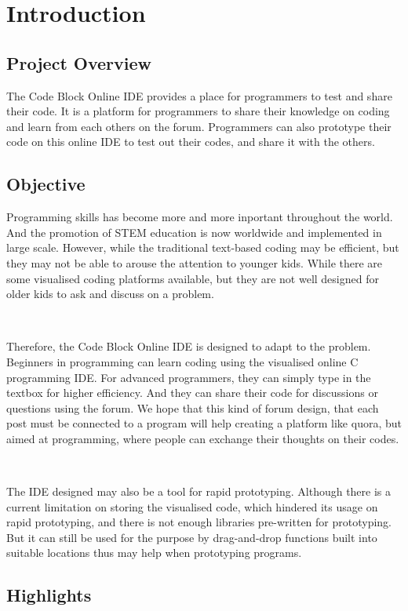 \chapter{Introduction}
\section{Project Overview}
The Code Block Online IDE provides a place for programmers to test and share their code. It is a platform for programmers to share their knowledge on coding and learn from each others on the forum. Programmers can also prototype their code on this online IDE to test out their codes, and share it with the others.

\section{Objective}
Programming skills has become more and more inportant throughout the world. And the promotion of STEM education is now worldwide and implemented in large scale. However, while the traditional text-based coding may be efficient, but they may not be able to arouse the attention to younger kids. While there are some visualised coding platforms available, but they are not well designed for older kids to ask and discuss on a problem.

~

Therefore, the Code Block Online IDE is designed to adapt to the problem. Beginners in programming can learn coding using the visualised online C programming IDE. For advanced programmers, they can simply type in the textbox for higher efficiency. And they can share their code for discussions or questions using the forum. We hope that this kind of forum design, that each post must be connected to a program will help creating a platform like quora, but aimed at programming, where people can exchange their thoughts on their codes.

~

The IDE designed may also be a tool for rapid prototyping. Although there is a current limitation on storing the visualised code, which hindered its usage on rapid prototyping, and there is not enough libraries pre-written for prototyping. But it can still be used for the purpose by drag-and-drop functions built into suitable locations thus may help when prototyping programs.

\section{Highlights}
